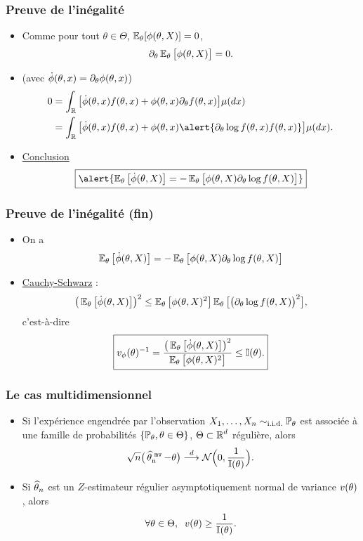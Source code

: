 \begin{frame}
\frametitle{Preuve de l'inégalité}
\begin{itemize}
\item Comme pour tout $\theta \in \Theta$, $\operatorname{{\mathbb E}}_\theta[\phi(\theta,X)]=0$, 
$$
\partial_\theta \operatorname{{\mathbb E}}_\theta\big[\phi(\theta,X)\big]=0.
$$
\item (avec $\dot\phi(\theta, x)=\partial_{\theta}\phi(\theta,x)$)
\begin{align*}
0&=\int_{\R}\big[\dot \phi(\truetheta,x)f(\truetheta,x)+\phi(\truetheta,x)\partial_\truetheta f(\truetheta,x)\big]\mu(dx)\\
& = \int_{\R}\big[\dot \phi(\truetheta,x)f(\truetheta,x)+\phi(\truetheta, x)\alert{\partial_\truetheta \log f(\truetheta, x) f(\truetheta,x)}\big]\mu(dx).
\end{align*}
\item \underline{Conclusion}
$$\boxed{\alert{\E_\truetheta\big[\dot \phi(\truetheta,X)\big] = -\E_\truetheta\big[\phi(\truetheta, X)\partial_\truetheta \log f(\truetheta,X)\big]}}$$
\end{itemize}
\end{frame}

\begin{frame}
\frametitle{Preuve de l'inégalité (fin)}
\begin{itemize}
\item On a
$$\operatorname{{\mathbb E}}_\theta\big[\dot \phi(\theta,X)\big] = -\operatorname{{\mathbb E}}_\theta\big[\phi(\theta, X)\partial_\theta \log f(\theta,X)\big]$$
\item \underline{Cauchy-Schwarz} :
$$\big(\operatorname{{\mathbb E}}_\theta\big[\dot \phi(\theta,X)\big] \big)^2 \leq \operatorname{{\mathbb E}}_\theta\big[\phi(\theta, X)^2\big] \operatorname{{\mathbb E}}_\theta\big[\big(\partial_\theta \log f(\theta,X)\big)^2\big],$$
c'est-à-dire
$$\boxed{v_\phi(\theta)^{-1} = \frac{\big(\operatorname{{\mathbb E}}_\theta\big[\dot \phi(\theta,X)\big] \big)^2}{\operatorname{{\mathbb E}}_\theta\big[\phi(\theta, X)^2\big]} \leq \mathbb{I}(\theta).}$$
\end{itemize}
\end{frame}

\begin{frame}
\frametitle{Le cas multidimensionnel}
\begin{prop}
\begin{itemize}
\item Si l'expérience engendrée par l'observation $X_1,\ldots, X_n\sim_{\text{i.i.d.}}\operatorname{{\mathbb P}}_\theta$ est associée à une famille de probabilités $\{\operatorname{{\mathbb P}}_\theta, \theta \in \Theta\}$,  $\Theta \subset \operatorname{{\mathbb R}}^d$ \alert{ régulière}, alors
$$\sqrt{n}\big(\operatorname{\widehat \theta_n^{\,\,{\tt mv}}}-\theta\big) \stackrel{d}{\longrightarrow} {\mathcal N}\Big(0,\frac{1}{\mathbb{I}(\theta)}\Big).$$
\item Si $\operatorname{\widehat \theta_{\mathnormal{n}}}$ est un $Z$-estimateur \alert{régulier} asymptotiquement normal de variance $v(\theta)$, alors
$$\forall \theta \in \Theta,\;\;v(\theta) \geq \frac{1}{\mathbb{I}(\theta)}.$$
\end{itemize}
\end{prop}
\end{frame}



